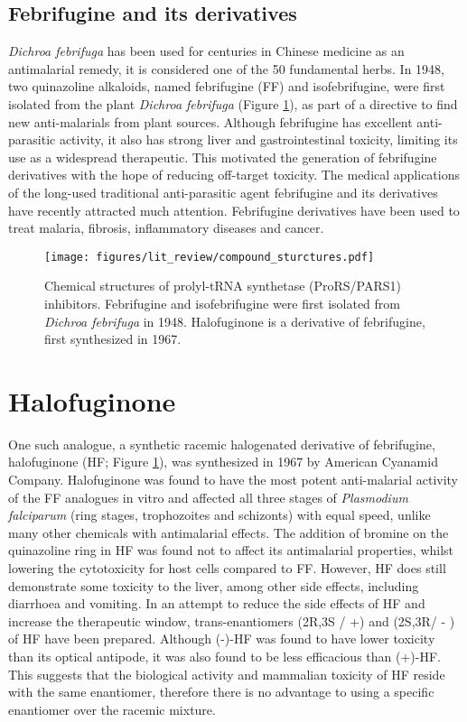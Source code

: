 \subsection{Febrifugine and its derivatives}\label{subsec:ff}
\textit{Dichroa febrifuga} has been used for centuries in Chinese medicine as an antimalarial remedy, it is considered one of the 50 fundamental herbs.
In 1948, two quinazoline alkaloids, named febrifugine (FF) and isofebrifugine, were first isolated from the plant \textit{Dichroa febrifuga} (Figure \ref{fig:FF_IF_HF})\cite{koepfli1949alkaloids}, as part of a directive to find new anti-malarials from plant sources.
Although febrifugine has excellent anti-parasitic activity, it also has strong liver and gastrointestinal toxicity, limiting its use as a widespread therapeutic.
This motivated the generation of febrifugine derivatives with the hope of reducing off-target toxicity.
The medical applications of the long-used traditional anti-parasitic agent febrifugine and its derivatives have recently attracted much attention.
Febrifugine derivatives have been used to treat malaria, fibrosis, inflammatory diseases and cancer.

\begin{figure}[htb]
\centering
\texttt{[image: figures/lit\_review/compound\_sturctures.pdf]}
\caption[Prolyl-tRNA synthetase inhibitor chemical structures]{Chemical structures of prolyl-tRNA synthetase (ProRS/PARS1) inhibitors.
Febrifugine and isofebrifugine were first isolated from \textit{Dichroa febrifuga} in 1948.
Halofuginone is a derivative of febrifugine, first synthesized in 1967.
}
\label{fig:FF_IF_HF}\end{figure}

\section{Halofuginone}
One such analogue, a synthetic racemic halogenated derivative of febrifugine, halofuginone (HF; Figure \ref{fig:FF_IF_HF}), was synthesized in 1967 by American Cyanamid Company\cite{zhang2017novel}.
Halofuginone was found to have the most potent anti-malarial activity of the FF analogues in vitro and affected all three stages of \textit{Plasmodium falciparum} (ring stages, trophozoites and schizonts) with equal speed, unlike many other chemicals with antimalarial effects.
The addition of bromine on the quinazoline ring in HF was found not to affect its antimalarial properties, whilst lowering the cytotoxicity for host cells compared to FF.
However, HF does still demonstrate some toxicity to the liver, among other side effects, including diarrhoea and vomiting\cite{pines2015halofuginone}.
In an attempt to reduce the side effects of HF and increase the therapeutic window, trans-enantiomers (2R,3S / +)  and (2S,3R/ - ) of HF have been prepared.
Although (-)-HF was found to have lower toxicity than its optical antipode, it was also found to be less efficacious than (+)-HF\cite{mordechay2021differential, linder20072r}.
This suggests that the biological activity and mammalian toxicity of HF reside with the same enantiomer, therefore there is no advantage to using a specific enantiomer over the racemic mixture.

